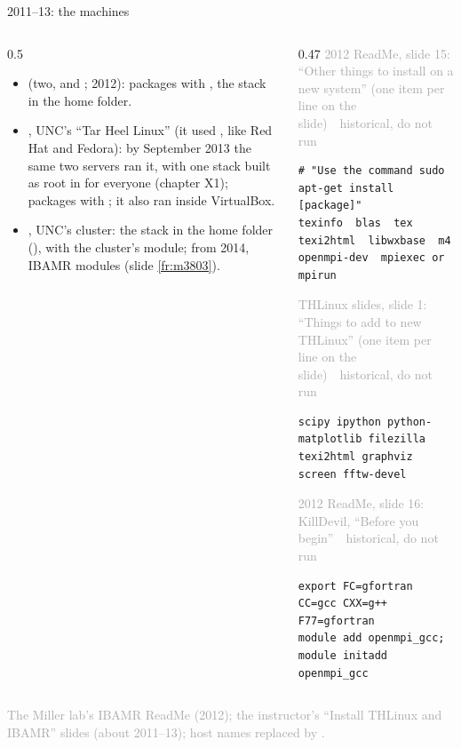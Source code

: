 \documentclass[aspectratio=169,11pt]{beamer}
\newcommand{\sourcecredit}[1]{\vfill\begin{flushright}\tiny\textcolor{DarkGray}{#1}\end{flushright}}
\newcommand{\hist}[1]{{\tiny\sffamily\textcolor{DarkGray}{#1\ \textbullet\ historical, do not run}}\par\nointerlineskip\vspace{0.3mm}}
\begin{document}
\begin{frame}[fragile]{2011--13: the machines}
\label{fr:machines}
\begin{columns}[T,onlytextwidth]
\begin{column}{0.5\textwidth}
\footnotesize
\begin{itemize}\setlength{\itemsep}{2pt}
  \item {} (two,  and ; 2012): packages with , the stack in the home folder.
  \item {}, UNC's ``Tar Heel Linux'' (it used , like Red Hat and Fedora): by September 2013 the same two servers ran it, with one stack built as root in  for everyone (chapter X1); packages with ; it also ran inside VirtualBox.
  \item {}, UNC's cluster: the stack in the home folder (), with the cluster's  module; from 2014, IBAMR modules (slide \ref{fr:m3803}).
\end{itemize}
\end{column}
\begin{column}{0.47\textwidth}
\hist{2012 ReadMe, slide 15: ``Other things to install on a new system'' (one item per line on the slide)}
\begin{lstlisting}[style=hist]
# "Use the command sudo apt-get install [package]"
texinfo  blas  tex  texi2html  libwxbase  m4  openmpi-dev  mpiexec or mpirun
\end{lstlisting}
\hist{THLinux slides, slide 1: ``Things to add to new THLinux'' (one item per line on the slide)}
\begin{lstlisting}[style=hist]
scipy ipython python-matplotlib filezilla texi2html graphviz screen fftw-devel
\end{lstlisting}
\hist{2012 ReadMe, slide 16: KillDevil, ``Before you begin''}
\begin{lstlisting}[style=hist]
export FC=gfortran CC=gcc CXX=g++ F77=gfortran
module add openmpi_gcc; module initadd openmpi_gcc
\end{lstlisting}
\end{column}
\end{columns}
\sourcecredit{The Miller lab's IBAMR ReadMe (2012); the instructor's ``Install THLinux and IBAMR'' slides (about 2011--13); host names replaced by \code{<host>}.}
\end{frame}
\end{document}
